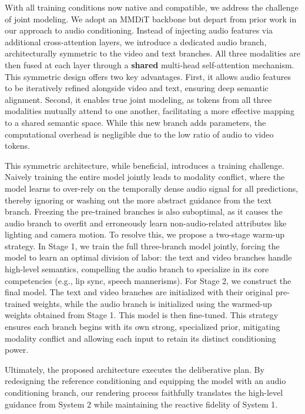  With all training conditions now native and compatible, we address the challenge of joint modeling. We adopt an MMDiT backbone but depart from prior work in our approach to audio conditioning. Instead of injecting audio features via additional cross-attention layers, we introduce a dedicated audio branch, architecturally symmetric to the video and text branches. All three modalities are then fused at each layer through a \textbf{shared} multi-head self-attention mechanism. This symmetric design offers two key advantages. First, it allows audio features to be iteratively refined alongside video and text, ensuring deep semantic alignment. Second, it enables true joint modeling, as tokens from all three modalities mutually attend to one another, facilitating a more effective mapping to a shared semantic space. While this new branch adds parameters, the computational overhead is negligible due to the low ratio of audio to video tokens.
\par
This symmetric architecture, while beneficial, introduces a training challenge. Naively training the entire model jointly leads to modality conflict, where the model learns to over-rely on the temporally dense audio signal for all predictions, thereby ignoring or washing out the more abstract guidance from the text branch. Freezing the pre-trained branches is also suboptimal, as it causes the audio branch to overfit and erroneously learn non-audio-related attributes like lighting and camera motion. To resolve this, we propose a two-stage warm-up strategy. In Stage 1, we train the full three-branch model jointly, forcing the model to learn an optimal division of labor: the text and video branches handle high-level semantics, compelling the audio branch to specialize in its core competencies (e.g., lip sync, speech mannerisms). For Stage 2, we construct the final model. The text and video branches are initialized with their original pre-trained weights, while the audio branch is initialized using the warmed-up weights obtained from Stage 1. This model is then fine-tuned. This strategy ensures each branch begins with its own strong, specialized prior, mitigating modality conflict and allowing each input to retain its distinct conditioning power. 
\par
Ultimately, the proposed architecture executes the deliberative plan. By redesigning the reference conditioning and equipping the model with an audio conditioning branch, our rendering process faithfully translates the high-level guidance from System 2 while maintaining the reactive fidelity of System 1.